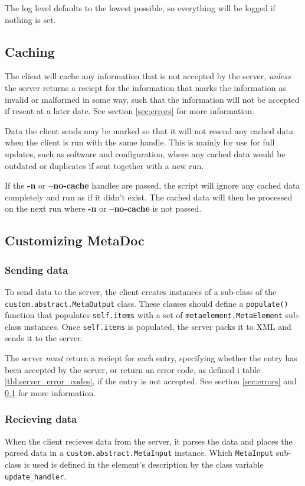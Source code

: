 \documentclass[titlepage, a4paper,10pt]{article}
\begin{document}
The log level defaults to the lowest possible, so everything will be logged if
nothing is set.

\subsection{Caching}
\label{sec:caching}
The client will cache any information that is not accepted by the server, 
\textit{unless} the server returns a reciept for the information that marks the 
information as invalid or malformed in some way, such that the information will 
not be accepted if resent at a later date. See section \ref{sec:errors} for
more information.

Data the client sends may be marked so that it will not resend any cached data
when the client is run with the same handle. This is mainly for use for full
updates, such as software and configuration, where any cached data would be
outdated or duplicates if sent together with a new run.

If the \textbf{-n} or \textbf{--no-cache} handles are passed, the script will
ignore any cached data completely and run as if it didn't exist. The cached
data will then be processed on the next run where \textbf{-n} or
\textbf{--no-cache} is not passed.

\subsection{Customizing MetaDoc}
\label{sec:customizing_client}

\subsubsection{Sending data}
To send data to the server, the client creates instances of a sub-class of the
\\
\texttt{custom.abstract.MetaOutput} class. These classes should define a
\texttt{populate()} function that populates \texttt{self.items} with a set of
\texttt{metaelement.MetaElement} sub-class instances. Once \texttt{self.items}
is populated, the server packs it to XML and sends it to the server.

The server \textit{must} return a reciept for each entry, specifying whether
the entry has been accepted by the server, or return an error code, as defined
i table \ref{tbl:server_error_codes}, if the entry is not accepted. See
section \ref{sec:errors} and \ref{sec:caching} for more information.

\subsubsection{Recieving data}
When the client recieves data from the server, it parses the data and places
the parsed data in a \texttt{custom.abstract.MetaInput} instance. Which
\texttt{MetaInput} sub-class is used is defined in the element's description by
the class variable \texttt{update\_handler}.
\end{document}
